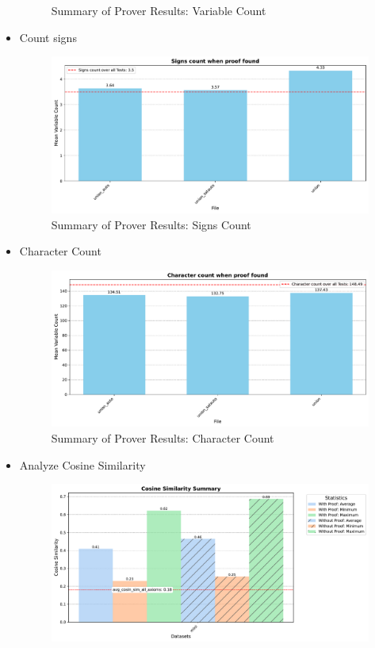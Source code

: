 \documentclass[german,version-2020-11]{uzl-thesis}
\begin{document}
\begin{itemize}
\begin{figure}[h!]
      \caption{Summary of Prover Results: Variable Count}
      \label{fig:prover_results_vampire}
    \end{figure}
    \clearpage
    \item Count signs
    \begin{figure}[h!]
      \centering
      \includegraphics[width=\textwidth]{signs_count.pdf} %
      \caption{Summary of Prover Results: Signs Count}
      \label{fig:prover_results_vampire}
    \end{figure}
    \clearpage
    \item Character Count
    \begin{figure}[h!]
      \centering
      \includegraphics[width=\textwidth]{character_count.pdf} %
      \caption{Summary of Prover Results: Character Count}
      \label{fig:prover_results_vampire}
    \end{figure}
    \clearpage
    \item Analyze Cosine Similarity
    \begin{figure}[h!]
      \centering
      \includegraphics[width=\textwidth]{cosine_similarity_mini_noAdded_summary.pdf} %

\end{figure}
\end{itemize}
\end{document}
